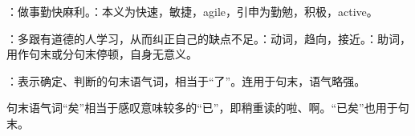 {
\item {}：做事勤快麻利。：本义为快速，敏捷，agile，引申为勤勉，积极，active。
\item {}：多跟有道德的人学习，从而纠正自己的缺点不足。：动词，趋向，接近。：助词，用作句末或分句末停顿，自身无意义。
\item {}：表示确定、判断的句末语气词，相当于“了”。连用于句末，语气略强。

句末语气词“矣”相当于感叹意味较多的“已”，即稍重读的啦、啊。“已矣”也用于句末。
}
{}  %


